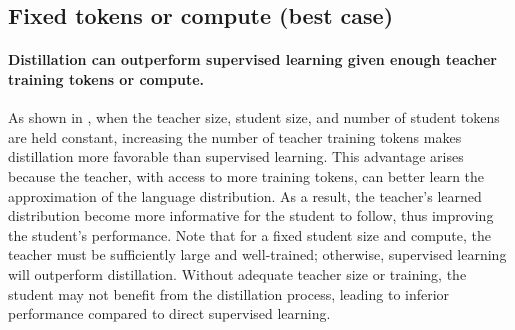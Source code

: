 \begin{table}[h]
    \centering
    \caption{Experimental setting differences between \citet{DBLP:conf/cvpr/BeyerZRMA022} and ours.}
    \vspace{-0.2cm}
    \label{tab:setting-differences}
\end{table}

\subsection{Fixed tokens or compute (best case)}
\label{ssec:fixed-tokens-or-compute-best-case-app}

\paragraph{Distillation can outperform supervised learning given enough teacher training tokens or compute.} As shown in , when the teacher size, student size, and number of student tokens are held constant, increasing the number of teacher training tokens makes distillation more favorable than supervised learning. 
This advantage arises because the teacher, with access to more training tokens, can better learn the approximation of the language distribution. 
As a result, the teacher's learned distribution become more informative for the student to follow, thus improving the student's performance. Note that for a fixed student size and compute, the teacher must be sufficiently large and well-trained; otherwise, supervised learning will outperform distillation. Without adequate teacher size or training, the student may not benefit from the distillation process, leading to inferior performance compared to direct supervised learning.

